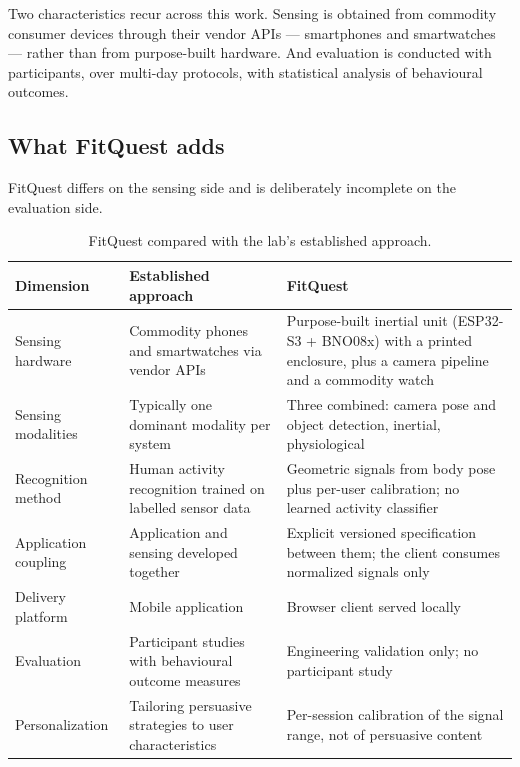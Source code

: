 \documentclass[11pt,a4paper]{article}
\begin{document}
Two characteristics recur across this work. Sensing is obtained from commodity
consumer devices through their vendor APIs --- smartphones and smartwatches ---
rather than from purpose-built hardware. And evaluation is conducted with
participants, over multi-day protocols, with statistical analysis of behavioural
outcomes.

\subsection{What FitQuest adds}

FitQuest differs on the sensing side and is deliberately incomplete on the
evaluation side.

\begin{table}[H]
\centering
\small
\caption{FitQuest compared with the lab's established approach.}
\label{tab:positioning}
\begin{tabularx}{\textwidth}{@{}L{3.4cm} L{5.0cm} Y@{}}
\toprule
\textbf{Dimension} & \textbf{Established approach} & \textbf{FitQuest} \\
\midrule
Sensing hardware & Commodity phones and smartwatches via vendor APIs & Purpose-built inertial unit (ESP32-S3 + BNO08x) with a printed enclosure, plus a camera pipeline and a commodity watch \\
\addlinespace
Sensing modalities & Typically one dominant modality per system & Three combined: camera pose and object detection, inertial, physiological \\
\addlinespace
Recognition method & Human activity recognition trained on labelled sensor data & Geometric signals from body pose plus per-user calibration; no learned activity classifier \\
\addlinespace
Application coupling & Application and sensing developed together & Explicit versioned specification between them; the client consumes normalized signals only \\
\addlinespace
Delivery platform & Mobile application & Browser client served locally \\
\addlinespace
Evaluation & Participant studies with behavioural outcome measures & Engineering validation only; no participant study \\
\addlinespace
Personalization & Tailoring persuasive strategies to user characteristics & Per-session calibration of the signal range, not of persuasive content \\
\bottomrule
\end{tabularx}
\end{table}
\end{document}
